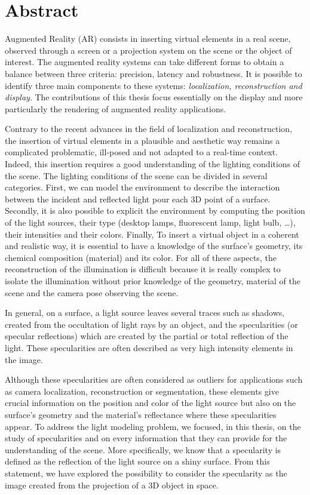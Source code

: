 \chapter*{Abstract}

\vspace{-1.3cm}

Augmented Reality (AR) consists in inserting virtual elements in a real scene, observed through a screen or a projection system on the scene or the object of interest. The augmented reality systems can take different forms to obtain a balance between three criteria: precision, latency and robustness. It is possible to identify three main components to these systems: \textit{localization, reconstruction and display}. The contributions of this thesis focus essentially on the display and more particularly the rendering of augmented reality applications.

Contrary to the recent advances in the field of localization and reconstruction, the insertion of virtual elements in a plausible and aesthetic way remains a complicated problematic, ill-posed and not adapted to a real-time context. Indeed, this insertion requires a good understanding of the lighting conditions of the scene. The lighting conditions of the scene can be divided in several categories. First, we can model the environment to describe the interaction between the incident and reflected light pour each 3D point of a surface. Secondly, it is also possible to explicit the environment by computing the position of the light sources, their type (desktop lamps, fluorescent lamp, light bulb, \ldots), their intensities and their colors. Finally, To insert a virtual object in a coherent and realistic way, it is essential to have a knowledge of the surface's geometry, its chemical composition (material) and its color. For all of these aspects, the reconstruction of the illumination is difficult because it is really complex to isolate the illumination without prior knowledge of the geometry, material of the scene and the camera pose observing the scene.

In general, on a surface, a light source leaves several traces such as shadows, created from the occultation of light rays by an object, and the specularities (or specular reflections) which are created by the partial or total reflection of the light. These specularities are often described as very high intensity elements in the image.

Although these specularities are often considered as outliers for applications such as camera localization, reconstruction or segmentation, these elements give crucial information on the position and color of the light source but also on the surface's geometry and the material's reflectance where these specularities appear. To address the light modeling problem, we focused, in this thesis, on the study of specularities and on every information that they can provide for the understanding of the scene. More specifically, we know that a specularity is defined as the reflection of the light source on a shiny surface. From this statement, we have explored the possibility to consider the specularity as the image created from the projection of a 3D object in space.

